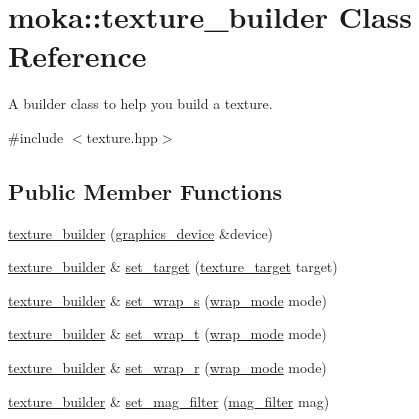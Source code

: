 \hypertarget{classmoka_1_1texture__builder}{}\section{moka\+::texture\+\_\+builder Class Reference}
\label{classmoka_1_1texture__builder}


A builder class to help you build a texture.  




{\ttfamily \#include $<$texture.\+hpp$>$}

\subsection*{Public Member Functions}
\begin{DoxyCompactItemize}
\item 
\mbox{\hyperlink{classmoka_1_1texture__builder_a37e13acb817ac3f5f5003278ae13bea0}{texture\+\_\+builder}} (\mbox{\hyperlink{classmoka_1_1graphics__device}{graphics\+\_\+device}} \&device)
\item 
\mbox{\hyperlink{classmoka_1_1texture__builder}{texture\+\_\+builder}} \& \mbox{\hyperlink{classmoka_1_1texture__builder_ac4ce6bf2b9e2d92867a8134f235016df}{set\+\_\+target}} (\mbox{\hyperlink{namespacemoka_a259bf395c8f07bd8d13515efcb542623}{texture\+\_\+target}} target)
\item 
\mbox{\hyperlink{classmoka_1_1texture__builder}{texture\+\_\+builder}} \& \mbox{\hyperlink{classmoka_1_1texture__builder_a555d3ea33ae09a175916eee13df9170c}{set\+\_\+wrap\+\_\+s}} (\mbox{\hyperlink{namespacemoka_afda3faa87bacaacc6008d8c1f73f6462}{wrap\+\_\+mode}} mode)
\item 
\mbox{\hyperlink{classmoka_1_1texture__builder}{texture\+\_\+builder}} \& \mbox{\hyperlink{classmoka_1_1texture__builder_a450b409d8c9fac1a54c89130825a6c9f}{set\+\_\+wrap\+\_\+t}} (\mbox{\hyperlink{namespacemoka_afda3faa87bacaacc6008d8c1f73f6462}{wrap\+\_\+mode}} mode)
\item 
\mbox{\hyperlink{classmoka_1_1texture__builder}{texture\+\_\+builder}} \& \mbox{\hyperlink{classmoka_1_1texture__builder_ab1113f82648d8e5555f53e0fd65ba294}{set\+\_\+wrap\+\_\+r}} (\mbox{\hyperlink{namespacemoka_afda3faa87bacaacc6008d8c1f73f6462}{wrap\+\_\+mode}} mode)
\item 
\mbox{\hyperlink{classmoka_1_1texture__builder}{texture\+\_\+builder}} \& \mbox{\hyperlink{classmoka_1_1texture__builder_a08398bb398d3b35e1ecd7a669b3fd792}{set\+\_\+mag\+\_\+filter}} (\mbox{\hyperlink{namespacemoka_a2391e4ae99494b70d0226ee0e586f33c}{mag\+\_\+filter}} mag)

\end{DoxyCompactItemize}

